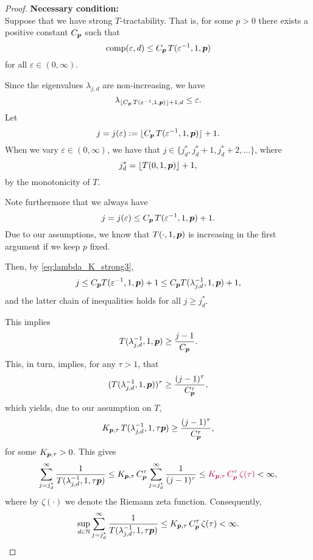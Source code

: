 \documentclass[11pt,a4paper]{article}
\newcommand{\peter}[1]{\begingroup\color{purple}#1\endgroup}
\begin{document}
\begin{proof}
\bigskip
\noindent \textbf{Necessary condition:} \\
Suppose that we have strong
$T$-tractability. That is, for some $p>0$ there exists a positive constant $C_{\boldsymbol{p}}$ such that
\[
\operatorname{comp}(\varepsilon,d)\le C_{\boldsymbol{p}}\, T(\varepsilon^{-1},1,\boldsymbol{p})
\]
for all $\varepsilon\in (0,\infty)$.


%

Since the eigenvalues $\lambda_{j,d}$ are non-increasing, we have
\begin{equation}\label{eq:lambda_K_strong3}
\lambda_{\lfloor C_{\boldsymbol{p}}\, T(\varepsilon^{-1},1,\boldsymbol{p})\rfloor +1,d}\le \varepsilon.
\end{equation}
Let
\[
j=j (\varepsilon):= \lfloor C_{\boldsymbol{p}}\, T(\varepsilon^{-1},1,\boldsymbol{p})\rfloor +1.
\]
When we vary $\varepsilon\in (0,\infty)$, we have that $j\in \{j_d^*, j_d^*+1, j_d^*+2,\ldots\}$, where
\[
  j_d^*=\lfloor  T(0,1,\boldsymbol{p})\rfloor +1,
\]
by the monotonicity of $T$.

Note furthermore that we always have
\[
j=j(\varepsilon)\le C_{\boldsymbol{p}}\, T(\varepsilon^{-1},1,\boldsymbol{p})+1.
\]
Due to our assumptions, we know that
$T(\cdot,1, \boldsymbol{p})$ is increasing in the first argument if
we keep $p$ fixed.

Then, by \eqref{eq:lambda_K_strong3},
\[
j \le C_{\boldsymbol{p}} T(\varepsilon^{-1},1,\boldsymbol{p})+1\le C_{\boldsymbol{p}} T(\lambda_{j,d}^{-1},1,\boldsymbol{p})+1,
\]
and the latter chain of inequalities holds for all $j\ge j_d^*$.


This implies
\[
 T(\lambda_{j,d}^{-1},1, \boldsymbol{p}) \ge \frac{j-1}{C_{\boldsymbol{p}}}.
\]
This, in turn, implies, for any $\tau>1$, that
\[
 (T(\lambda_{j,d}^{-1},1, \boldsymbol{p}))^\tau \ge \frac{(j-1)^\tau}{C_{\boldsymbol{p}}^\tau },
\]
which yields, due to our assumption on $T$,
\[
 K_{\boldsymbol{p},\tau}\,T (\lambda_{j,d}^{-1},1,\tau \boldsymbol{p}) \ge \frac{(j-1)^\tau}{C_{\boldsymbol{p}}^\tau},
\]
for some $K_{\boldsymbol{p},\tau}>0$.
This gives
\[
\sum_{j=j_d^*}^\infty \frac{1}{T (\lambda_{j,d}^{-1},1, \tau \vp)} \le K_{\vp,\tau}\, C_{\vp}^\tau
\sum_{j=j_d^*}^\infty \frac{1}{(j-1)^\tau} \le
\peter{K_{\vp,\tau}\, C_{\vp}^\tau\, \zeta (\tau) }< \infty,
\]
\peter{where by $\zeta(\cdot)$ we denote the Riemann zeta function. Consequently,
\[
\sup_{d\in\mathbb{N}} \sum_{j=j_d^*}^\infty \frac{1}{T (\lambda_{j,d}^{-1},1, \tau \boldsymbol{p})} \le K_{\boldsymbol{p},\tau}\, C_{\boldsymbol{p}}^\tau\, \zeta (\tau) < \infty.
\]
}



\end{proof}
\end{document}

